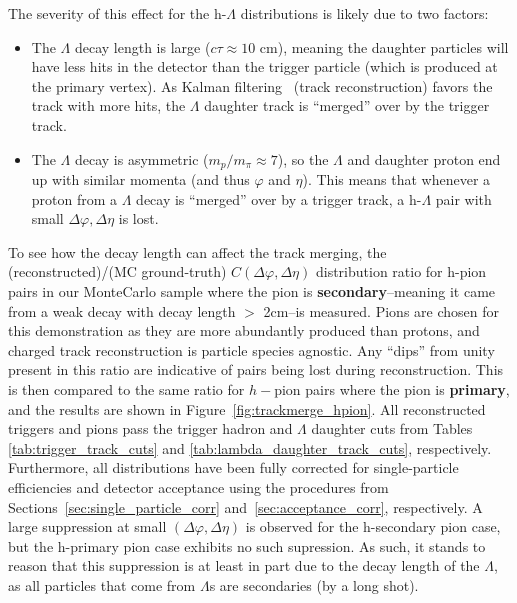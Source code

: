 The severity of this effect for the h-$\Lambda$ distributions is likely due to two factors:
%
\begin{itemize}
\item The $\Lambda$ decay length is large ($c\tau \approx 10$ cm), meaning the daughter particles will have less hits in the detector than the trigger particle (which is produced at the primary vertex). As Kalman filtering~\cite{Kalman} (track reconstruction) favors the track with more hits, the $\Lambda$ daughter track is ``merged'' over by the trigger track.
\item The $\Lambda$ decay is asymmetric ($m_{p}/m_{\pi} \approx 7$), so the $\Lambda$ and daughter proton end up with similar momenta (and thus $\varphi$ and $\eta$). This means that whenever a proton from a $\Lambda$ decay is ``merged'' over by a trigger track, a h-$\Lambda$ pair with small $\Delta\varphi, \Delta\eta$ is lost.
\end{itemize}
%
To see how the decay length can affect the track merging, the (reconstructed)/(MC ground-truth) $C(\Delta\varphi, \Delta\eta)$ distribution ratio for h-pion pairs in our MonteCarlo sample where the pion is \textbf{secondary}--meaning it came from a weak decay with decay length $>$ 2cm--is measured. Pions are chosen for this demonstration as they are more abundantly produced than protons, and charged track reconstruction is particle species agnostic. Any ``dips'' from unity present in this ratio are indicative of pairs being lost during reconstruction. This is then compared to the same ratio for $h-$pion pairs where the pion is \textbf{primary}, and the results are shown in Figure~\ref{fig:trackmerge_hpion}. All reconstructed triggers and pions pass the trigger hadron and $\Lambda$ daughter cuts from Tables \ref{tab:trigger_track_cuts} and \ref{tab:lambda_daughter_track_cuts}, respectively. Furthermore, all distributions have been fully corrected for single-particle efficiencies and detector acceptance using the procedures from Sections~\ref{sec:single_particle_corr} and~\ref{sec:acceptance_corr}, respectively. A large suppression at small $(\Delta\varphi, \Delta\eta)$ is observed for the h-secondary pion case, but the h-primary pion case exhibits no such supression. As such, it stands to reason that this suppression is at least in part due to the decay length of the $\Lambda$, as all particles that come from $\Lambda$s are secondaries (by a long shot).

